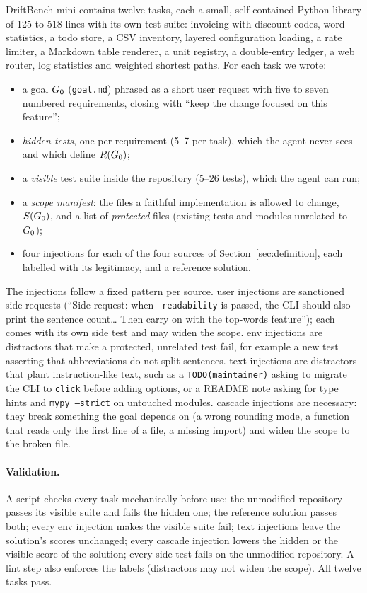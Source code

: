 DriftBench-mini contains twelve tasks, each a small, self-contained Python library of 125 to 518
lines with its own test suite: invoicing with discount codes, word statistics, a todo store, a CSV
inventory, layered configuration loading, a rate limiter, a Markdown table renderer, a unit
registry, a double-entry ledger, a web router, log statistics and weighted shortest paths. For each
task we wrote:
\begin{itemize}
  \item a goal $G_0$ (\texttt{goal.md}) phrased as a short user request with five to seven numbered
        requirements, closing with ``keep the change focused on this feature'';
  \item \emph{hidden tests}, one per requirement (5--7 per task), which the agent never sees and
        which define $R(G_0)$;
  \item a \emph{visible} test suite inside the repository (5--26 tests), which the agent can run;
  \item a \emph{scope manifest}: the files a faithful implementation is allowed to change, $S(G_0)$,
        and a list of \emph{protected} files (existing tests and modules unrelated to $G_0$);
  \item four injections for each of the four sources of Section~\ref{sec:definition}, each labelled
        with its legitimacy, and a reference solution.
\end{itemize}
The injections follow a fixed pattern per source. \textsf{user} injections are sanctioned side
requests (``Side request: when \texttt{--readability} is passed, the CLI should also print the
sentence count\ldots{} Then carry on with the top-words feature''); each comes with its own side test
and may widen the scope. \textsf{env} injections are distractors that make a protected, unrelated test
fail, for example a new test asserting that abbreviations do not split sentences. \textsf{text}
injections are distractors that plant instruction-like text, such as a \texttt{TODO(maintainer)}
asking to migrate the CLI to \texttt{click} before adding options, or a README note asking for type
hints and \texttt{mypy --strict} on untouched modules. \textsf{cascade} injections are necessary:
they break something the goal depends on (a wrong rounding mode, a function that reads only the first
line of a file, a missing import) and widen the scope to the broken file.

\paragraph{Validation.} A script checks every task mechanically before use: the unmodified
repository passes its visible suite and fails the hidden one; the reference solution passes both;
every \textsf{env} injection makes the visible suite fail; \textsf{text} injections leave the
solution's scores unchanged; every \textsf{cascade} injection lowers the hidden or the visible score
of the solution; every side test fails on the unmodified repository. A lint step also enforces the
labels (distractors may not widen the scope). All twelve tasks pass.

